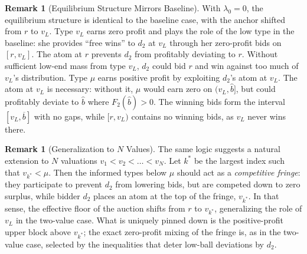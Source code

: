 \documentclass[11pt]{article}
\theoremstyle{plain}
\theoremstyle{definition}
\newtheorem{rem}[thm]{Remark}
\theoremstyle{plain}
\theoremstyle{plain}
\theoremstyle{plain}
\theoremstyle{plain}
\numberwithin{equation}{section}
\begin{document}
\begin{rem}[Equilibrium Structure Mirrors Baseline]
    With $\lambda_0 = 0$, the equilibrium structure is identical to the baseline case, with the anchor shifted from $r$ to $v_L$. Type $v_L$ earns zero profit and plays the role of the low type in the baseline: she provides ``free wins'' to $d_2$ at $v_L$ through her zero-profit bids on $[r, v_L]$. The atom at $r$ prevents $d_2$ from profitably deviating to $r$. Without sufficient low-end mass from type $v_L$, $d_2$ could bid $r$ and win against too much of $v_L$'s distribution. Type $\mu$ earns positive profit by exploiting $d_2$'s atom at $v_L$. The atom at $v_L$ is necessary: without it, $\mu$ would earn zero on $(v_L, \hat{b}]$, but could profitably deviate to $\hat{b}$ where $F_2(\hat{b}) > 0$. The winning bids form the interval $[v_L, \overline{b}]$ with no gaps, while $[r, v_L)$ contains no winning bids, as $v_L$ never wins there.
\end{rem}
\vspace{2mm}

\begin{rem}[Generalization to $N$ Values]
The same logic suggests a natural extension to $N$ valuations $v_1 < v_2 < \dots < v_N$. Let $k^*$ be the largest index such that $v_{k^*} < \mu$. Then the informed types below $\mu$ should act as a \textit{competitive fringe}: they participate to prevent $d_2$ from lowering bids, but are competed down to zero surplus, while bidder $d_2$ places an atom at the top of the fringe, $v_{k^*}$. In that sense, the effective floor of the auction shifts from $r$ to $v_{k^*}$, generalizing the role of $v_L$ in the two-value case. What is uniquely pinned down is the positive-profit upper block above $v_{k^*}$; the exact zero-profit mixing of the fringe is, as in the two-value case, selected by the inequalities that deter low-ball deviations by $d_2$.
\end{rem}
\vspace{2mm}
\end{document}
